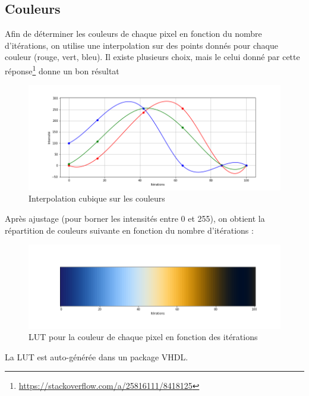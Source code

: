 \documentclass[LPSC_Labo03_SDeriaz]{subfiles}
\begin{document}
\subsection{Couleurs}
Afin de déterminer les couleurs de chaque pixel en fonction du nombre d'itérations, on utilise une interpolation sur des points donnés pour chaque couleur (rouge, vert, bleu). Il existe plusieurs choix, mais le celui donné par cette réponse\footnote{\url{https://stackoverflow.com/a/25816111/8418125}} donne un bon résultat
\begin{figure}[H]
\centering
\includegraphics[width=12cm]{LUT_points.png}
\caption{Interpolation cubique sur les couleurs}
\end{figure}
Après ajustage (pour borner les intensités entre 0 et 255), on obtient la répartition de couleurs suivante en fonction du nombre d'itérations :
\begin{figure}[H]
\centering
\includegraphics[width=12cm]{LUT.png}
\caption{LUT pour la couleur de chaque pixel en fonction des itérations}
\end{figure}
La LUT est auto-générée dans un package VHDL.
\end{document}
